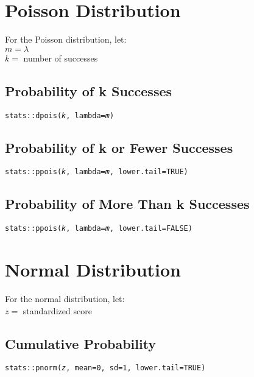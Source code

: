 \documentclass{tufte-handout}
\newenvironment{subs}
  {\adjustwidth{3em}{0pt}}
  {\endadjustwidth}
\begin{document}
\vspace{5mm}
\section{Poisson Distribution}
For the Poisson distribution, let: \\
\noindent $m = \lambda $ \\
\noindent $k = $ number of successes

\begin{subs}

\vspace{3mm}
\subsection{Probability of k Successes}
\noindent \texttt{stats::}{\color{red}\texttt{dpois}}\texttt{(\textit{k}, lambda=\textit{m})}\\

\vspace{3mm}
\subsection{Probability of k or Fewer Successes}
\noindent \texttt{stats::}{\color{red}\texttt{ppois}}\texttt{(\textit{k}, lambda=\textit{m}, lower.tail=TRUE)}\\

\vspace{3mm}
\subsection{Probability of More Than k Successes}
\noindent \texttt{stats::}{\color{red}\texttt{ppois}}\texttt{(\textit{k}, lambda=\textit{m}, lower.tail=FALSE)}\\

\end{subs}

\vspace{5mm}
\section{Normal Distribution}
For the normal distribution, let: \\
\noindent $z =$ standardized score\\

\begin{subs}

\vspace{3mm}
\subsection{Cumulative Probability}
\noindent \texttt{stats::}{\color{red}\texttt{pnorm}}\texttt{(\textit{z}, mean=0, sd=1, lower.tail=TRUE)}\\

\end{subs}
\end{document}
